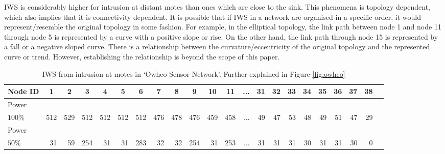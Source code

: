 \documentclass[conference,final]{IEEEtran}
\newcommand*{\bd}[1]{\multicolumn{1}{|c}{\bfseries #1}}
\begin{document}
IWS is considerably higher for intrusion at distant motes than ones which are close to the sink.
This phenomena is topology dependent, which also implies   that it is connectivity dependent.
It is possible that if IWS in a network are organised in a specific order, it would represent/resemble   the original topology in some fashion.
For example, in the elliptical topology, the link path between node 1 and node 11 through node 5 is represented by a curve with a positive slope or rise.
On the other hand, the link path through node 15 is represented by a fall or a negative sloped curve.
There is a relationship between the curvature/eccentricity of the original topology and the represented curve or  trend.
However, establishing the relationship is beyond the scope of this paper.



\begin{table}[t!]
\centering
\begin{tabular}{|l|*{20}{r|}r}
\hline
\bd{Node ID}           & \bd{1} & \bd{2} & \bd{3} & \bd{4} & \bd{5} & \bd{6} & \bd{7} & \bd{8} & \bd{9} & \bd{10} & \bd{11} & \bd{...} & \bd{31} & \bd{32} & \bd{33} & \bd{34} & \bd{35} & \bd{36} & \bd{37} & \bd{38} \\
\hline		\hline

Power	  &  &  &  &  &  &  &  &  &  &  &  &  &  &  &   &  &  &  &  &  \\
$100\% $          & 512 & 529 & 512 & 512 & 512  & 512 & 476 & 478 & 476 & 459 & 458 & ...& 49 & 47 & 53  & 48 & 49 & 51 & 47 & 29 \\
\hline

Power	  &  &  &  &  &  &  &  &  &  &  &  &  &  &  &   &  &  &  &  &  \\
$50\%$            &31 & 59&254& 31& 31 &283& 32& 32& 254& 31 &253 & ...& 31 & 31 & 31  & 30 & 31 & 31 & 30 & 0 \\
\hline
\end{tabular}
\caption{IWS from intrusion at motes in `Owheo Sensor Network'. Further explained in Figure-\ref{fig:owheo}}
\label{tab:owheo}
\end{table}
\end{document}

